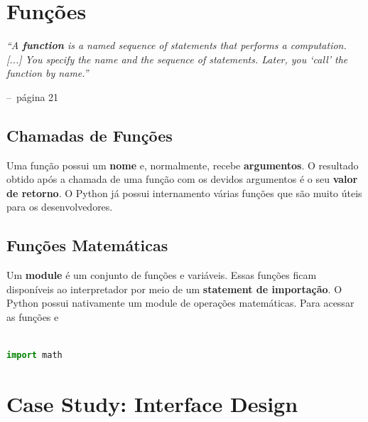 \documentclass[a4paper,11pt]{book}
\makeatletter
\newenvironment{chapquote}[2][2em]
  {\setlength{\@tempdima}{#1}%
   \def\chapquote@author{#2}%
   \parshape 1 \@tempdima \dimexpr\textwidth-2\@tempdima\relax%
   \itshape}
  {\par\normalfont\hfill--\ \chapquote@author\hspace*{\@tempdima}\par\bigskip}
\makeatother
\begin{document}
\chapter{Funções}

\begin{chapquote}{página 21}
	``A \textbf{function} is a named sequence of statements that performs a computation. [...] You specify the name and the sequence of statements. Later, you `call' the function by name.''
\end{chapquote}

\section{Chamadas de Funções}
Uma função possui um \textbf{nome} e, normalmente, recebe \textbf{argumentos}. O resultado obtido após a chamada de uma função com os devidos argumentos é o seu \textbf{valor de retorno}. O Python já possui internamento várias funções que são muito úteis para os desenvolvedores. 

\section{Funções Matemáticas}
Um \textbf{module} é um conjunto de funções e variáveis. Essas funções ficam disponíveis ao interpretador por meio de um \textbf{statement de importação}. O Python possui nativamente um module de operações matemáticas. Para acessar as funções e 

\begin{lstlisting}[language=Python, caption=Carregando o module math]

import math


\end{lstlisting}


















\chapter{Case Study: Interface Design}
\end{document}
